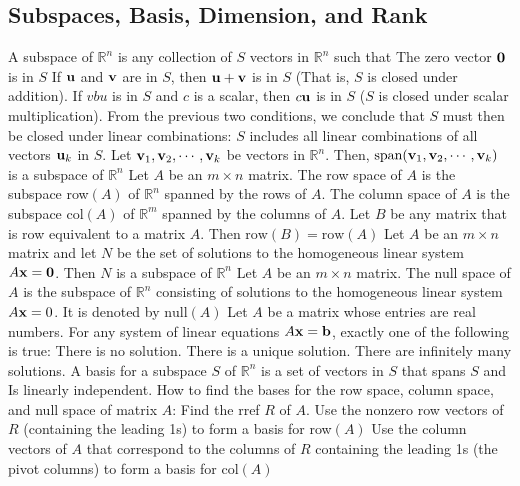 \documentclass{article}
\begin{document}
   \subsection{Subspaces, Basis, Dimension, and Rank}
   \begin{outline}
        \1 A subspace of \(\mathbb R^n\) is any collection of $S$ vectors in \(\mathbb R^n\) such that 
            \2 The zero vector \(\vb 0\) is in $S$
            \2 If \(\vb u\) and \(\vb v\) are in $S$, then \(\vb u+\vb v\) is in $S$ (That is, $S$ is closed under addition). 
            \2 If \(vb u\) is in $S$ and $c$ is a scalar, then \(c\vb u\) is in $S$ ($S$ is closed under scalar multiplication). 
            \2 From the previous two conditions, we conclude that $S$ must then be closed under linear combinations: $S$ includes all linear combinations of all vectors \(\vb u_k\) in $S$. 
        \1 Let \(\vb v_1,\vb v_2,\cdots,\vb v_k\) be vectors in \(\mathbb R^n\). Then, \(\text{span}(\vb v_1,\vb v_2,\cdots,\vb v_k)\) is a subspace of \(\mathbb R^n\)
        \1 Let \(A\) be an \(m\times n\) matrix. 
            \2 The row space of $A$ is the subspace row\((A)\) of \(\mathbb R^n\) spanned by the rows of \(A\). 
            \2 The column space of \(A\) is the subspace col\((A)\) of \(\mathbb R^m\) spanned by the columns of \(A\). 
        \1 Let \(B\) be any matrix that is row equivalent to a matrix \(A\). Then \(\text{row}(B)=\text{row}(A)\)
        \1 Let \(A\) be an \(m\times n\) matrix and let \(N\) be the set of solutions to the homogeneous linear system \(A\vb x=\vb 0\). Then \(N\) is a subspace of \(\mathbb R^n\)
        \1 Let \(A\) be an \(m\times n\) matrix. The null space of \(A\) is the subspace of \(\mathbb R^n\) consisting of solutions to the homogeneous linear system \(A\vb x=0\). It is denoted by \(\text{null}(A)\)
        \1 Let \(A\) be a matrix whose entries are real numbers. For any system of linear equations \(A\vb x=\vb b\), exactly one of the following is true: 
            \2 There is no solution. 
            \2 There is a unique solution. 
            \2 There are infinitely many solutions. 
        \1 A basis for a subspace $S$ of \(\mathbb R^n\) is a set of vectors in $S$ that 
            \2 spans $S$ and 
            \2 Is linearly independent. 
        \1 How to find the bases for the row space, column space, and null space of matrix \(A\):
            \2 Find the rref $R$ of $A$. 
            \2 Use the nonzero row vectors of $R$ (containing the leading 1s) to form a basis for row\((A)\)
            \2 Use the column vectors of \(A\) that correspond to the columns of $R$ containing the leading 1s (the pivot columns) to form a basis for col\((A)\)

\end{outline}
\end{document}
